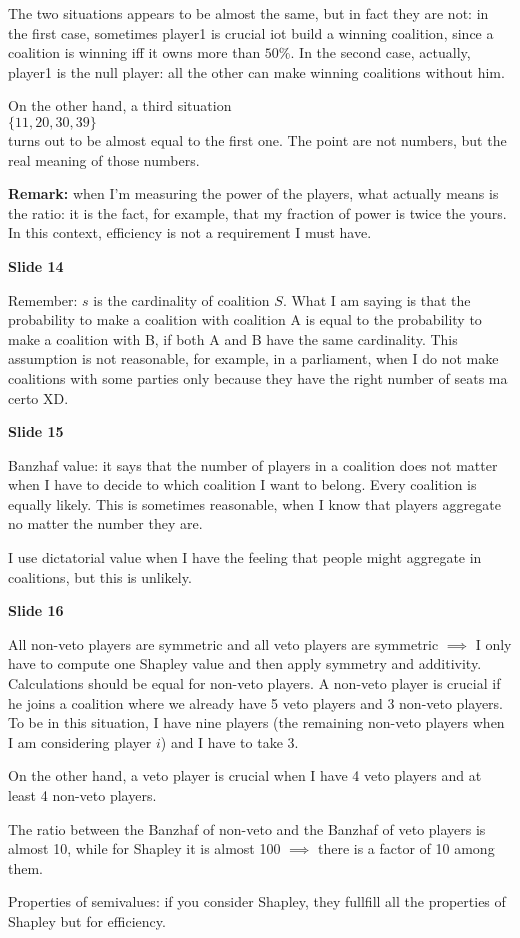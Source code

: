 \documentclass[pt11,a4paper,twoside,reqno,openright]{paper}
\begin{document}
\noindent The two situations appears to be almost the same, but in fact they are 
not: in the first case, sometimes player1 is crucial iot build a winning 
coalition, since a coalition is winning iff it owns more than $50\%$. 
In the second case, actually, player1 is the null player: all the other 
can make winning coalitions without him.

\noindent On the other hand, a third situation\\
$\{11, 20, 30, 39\}$\\
turns out to be almost equal to the first one. The point are not numbers, but 
the real meaning of those numbers.

\noindent \textbf{Remark:} when I'm measuring the power of the players, what 
actually means is the ratio: it is the fact, for example, that my fraction 
of power is twice the yours. In this context, efficiency is not a 
requirement I must have.

\bigskip
\noindent \textbf{Slide 14}

\noindent Remember: $s$ is the cardinality of coalition $S$. What I am saying 
is that the probability to make a coalition with coalition A is equal to 
the probability to make a coalition with B, if both A and B have the same 
cardinality. This assumption is not reasonable, for example, in a parliament, 
when I do not make coalitions with some parties only because they have the 
right number of seats {\huge ma certo XD}.

\bigskip
\noindent \textbf{Slide 15}

\noindent Banzhaf value: it says that the number of players in a coalition 
does not matter when I have to decide to which coalition I want to belong. 
Every coalition is equally likely. This is sometimes reasonable, when I 
know that players aggregate no matter the number they are.

\noindent I use dictatorial value when I have the feeling that people might 
aggregate in coalitions, but this is unlikely.

\bigskip
\noindent \textbf{Slide 16}

\noindent All non-veto players are symmetric and all veto players are 
symmetric $\implies$ I only have to compute one Shapley value and then 
apply symmetry and additivity. Calculations should be equal for non-veto 
players. A non-veto player is crucial if he joins a coalition where we already 
have 5 veto players and 3 non-veto players. To be in this situation, I have 
nine players (the remaining non-veto players when I am considering player 
$i$) and I have to take 3.

\noindent On the other hand, a veto player is crucial when I have 4 veto 
players and at least 4 non-veto players.

\noindent The ratio between the Banzhaf of non-veto and the Banzhaf of 
veto players is almost 10, while for Shapley it is almost 100 $\implies$ 
there is a factor of 10 among them.

\noindent Properties of semivalues: if you consider Shapley, they fullfill 
all the properties of Shapley but for efficiency.
\end{document}
